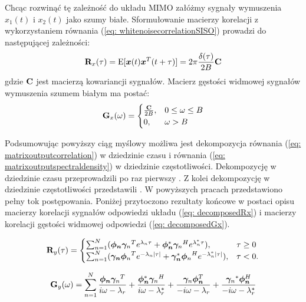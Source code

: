 Chcąc rozwinąć tę zależność do układu MIMO załóżmy sygnały wymuszenia $x_1(t)$ i $x_2(t)$ jako szumy białe. Sformułowanie macierzy korelacji z wykorzystaniem równania (\ref{eq: whitenoisecorrelationSISO}) prowadzi do następującej zależności:
 \begin{equation} \label{eq: whitenoisecorrelationMIMO}
 	\mathbf{R}_x(\tau)=\mathrm{E}[\bm{x}(t)\bm{x}^T(t+\tau)]=2\pi \frac{\delta(\tau)}{2B}\mathbf{C}
 \end{equation} 
gdzie $\mathbf{C}$ jest macierzą kowariancji sygnałów. Macierz gęstości widmowej sygnałów wymuszenia szumem białym ma postać:
 \begin{equation} \label{eq: spectraldensitymatrixWHITENOISE}
	\mathbf{G}_x(\omega)=\begin{cases}
		\frac{\mathbf{C}}{2B}, & 0\le\omega\le B\\
		0, & \omega>B
		\end{cases}
\end{equation} 
 

Podsumowując powyższy ciąg myślowy możliwa jest dekompozycja równania (\ref{eq: matrixoutputcorrelation}) w dziedzinie czasu i równania (\ref{eq: matrixoutputspectraldensity}) w dziedzinie częstotliwości. Dekompozycję w dziedzinie czasu przeprowadzili po raz pierwszy \cite{James1993,James1995}. Z kolei dekompozycję w dziedzinie częstotliwości przedstawili \cite{Brincker2000,Brincker2001a}. W powyższych pracach przedstawiono pełny tok postępowania. Poniżej przytoczono rezultaty końcowe w postaci opisu macierzy korelacji sygnałów odpowiedzi układu (\ref{eq: decomposedRx}) i macierzy korelacji gęstości widmowej odpowiedzi (\ref{eq: decomposedGx}).

\begin{equation} \label{eq: decomposedRx}
	\mathbf{R}_y(\tau)=\begin{cases}
		\sum_{n=1}^{N} (\bm{\phi_n}{\bm{\gamma}_n}^Te^{\lambda_n \tau} + \bm{\phi_n}^*{\bm{\gamma}_n}^He^{\lambda_n^* \tau}), & \tau\ge 0\\
		\sum_{n=1}^{N} (\bm{\gamma_n}{\bm{\phi}_n}^Te^{-\lambda_n |\tau|} + \bm{\gamma_n}^*{\bm{\phi}_n}^He^{-\lambda_n^* |\tau|}), & \tau< 0.
	\end{cases}
\end{equation} 

\begin{equation} \label{eq: decomposedGx}
	\mathbf{G}_y(\omega)=\sum_{n=1}^{N}\frac{\bm{\phi_n}{\bm{\gamma}_n}^T}{i\omega-\lambda_r}+\frac{\bm{\phi_n}^*{\bm{\gamma}_n}^H}{i\omega-\lambda_r^*}+\frac{{\bm{\gamma}_n}\bm{\phi_n}^T}{-i\omega-\lambda_r}+\frac{{\bm{\gamma}_n}^*\bm{\phi_n}^H}{-i\omega-\lambda_r^*}
\end{equation} 


